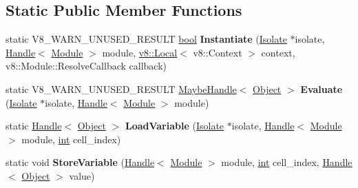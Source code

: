 \subsection*{Static Public Member Functions}
\begin{DoxyCompactItemize}
\item 
\mbox{\label{classv8_1_1internal_1_1Module_ac0d9d3bc17cff1f5a1efa91e0951b04c}} 
static V8\+\_\+\+W\+A\+R\+N\+\_\+\+U\+N\+U\+S\+E\+D\+\_\+\+R\+E\+S\+U\+LT \mbox{\hyperlink{classbool}{bool}} {\bfseries Instantiate} (\mbox{\hyperlink{classv8_1_1internal_1_1Isolate}{Isolate}} $\ast$isolate, \mbox{\hyperlink{classv8_1_1internal_1_1Handle}{Handle}}$<$ \mbox{\hyperlink{classv8_1_1internal_1_1Module}{Module}} $>$ module, \mbox{\hyperlink{classv8_1_1Local}{v8\+::\+Local}}$<$ v8\+::\+Context $>$ context, v8\+::\+Module\+::\+Resolve\+Callback callback)
\item 
\mbox{\label{classv8_1_1internal_1_1Module_a3417736f09a9024b975a370ec5bde29e}} 
static V8\+\_\+\+W\+A\+R\+N\+\_\+\+U\+N\+U\+S\+E\+D\+\_\+\+R\+E\+S\+U\+LT \mbox{\hyperlink{classv8_1_1internal_1_1MaybeHandle}{Maybe\+Handle}}$<$ \mbox{\hyperlink{classv8_1_1internal_1_1Object}{Object}} $>$ {\bfseries Evaluate} (\mbox{\hyperlink{classv8_1_1internal_1_1Isolate}{Isolate}} $\ast$isolate, \mbox{\hyperlink{classv8_1_1internal_1_1Handle}{Handle}}$<$ \mbox{\hyperlink{classv8_1_1internal_1_1Module}{Module}} $>$ module)
\item 
\mbox{\label{classv8_1_1internal_1_1Module_ae2d9ad82553a258a859ce00e1e819510}} 
static \mbox{\hyperlink{classv8_1_1internal_1_1Handle}{Handle}}$<$ \mbox{\hyperlink{classv8_1_1internal_1_1Object}{Object}} $>$ {\bfseries Load\+Variable} (\mbox{\hyperlink{classv8_1_1internal_1_1Isolate}{Isolate}} $\ast$isolate, \mbox{\hyperlink{classv8_1_1internal_1_1Handle}{Handle}}$<$ \mbox{\hyperlink{classv8_1_1internal_1_1Module}{Module}} $>$ module, \mbox{\hyperlink{classint}{int}} cell\+\_\+index)
\item 
\mbox{\label{classv8_1_1internal_1_1Module_ae6591b5da3b3eb993484d0dd1e6bf9e3}} 
static void {\bfseries Store\+Variable} (\mbox{\hyperlink{classv8_1_1internal_1_1Handle}{Handle}}$<$ \mbox{\hyperlink{classv8_1_1internal_1_1Module}{Module}} $>$ module, \mbox{\hyperlink{classint}{int}} cell\+\_\+index, \mbox{\hyperlink{classv8_1_1internal_1_1Handle}{Handle}}$<$ \mbox{\hyperlink{classv8_1_1internal_1_1Object}{Object}} $>$ value)

\end{DoxyCompactItemize}
